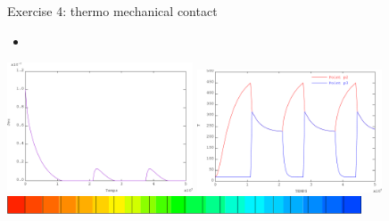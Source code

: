 \begin{frame}{
                 {Exercise 4: thermo mechanical contact}}
             {}
  \begin{itemize}
    \item {}
  \end{itemize}
  \begin{center}
    \includegraphics[width=5.5cm]{images/exo/exo_4_solu_evol_jeu}
    \includegraphics[width=5.5cm]{images/exo/exo_4_solu_evol_t}\\
    \vspace{0.5cm}
    \if {}
    \else
      \includegraphics[width=10.5cm]{images/exo/exo_4_solu_temperature.101}
    \fi
  \end{center}
\end{frame}


